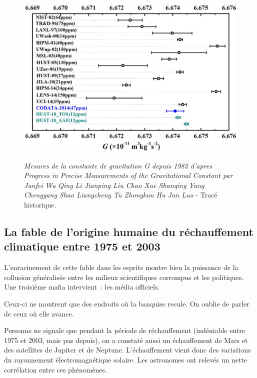 \documentclass[a4paper,12pt]{article}
\begin{document}
\begin{figure}
\centering
\includegraphics[width=14.5cm,height=8.6cm]{./figures/ProgressinPreciseMeasurementsoftheGravitationalConstant.png}
\caption [Mesures de la constante de gravitation G depuis 1982]{\textit{Mesures de la constante de gravitation G depuis 1982 d'apres Progress in Precise Measurements of the Gravitational Constant par Junfei Wu  Qing Li  Jianping Liu  Chao Xue  Shanqing Yang  Chenggang Shao  Liangcheng Tu  Zhongkun Hu  Jun Luo} - Tracé historique.} 
\label{fig:8:figure8}
\end{figure}






\subsection {La fable de l'origine humaine du réchauffement climatique entre 1975 et 2003}

L’enracinement de cette fable dans les esprits montre bien la puissance de la collusion généralisée entre les milieux scientifiques corrompus et les politiques. Une troisième mafia intervient : les média officiels.

Ceux-ci ne montrent que des endroits où la banquise recule. On oublie de parler de ceux où elle avance.

Personne ne signale que pendant la période de réchauffement (indéniable entre 1975 et 2003, mais pas depuis), on a constaté aussi un échauffement de Mars et des satellites de Jupiter et de Neptune. L’échauffement vient donc des variations du rayonnement électromagnétique solaire. Les astronomes ont relevés un nette corrélation entre ces phénomènes.
\end{document}
